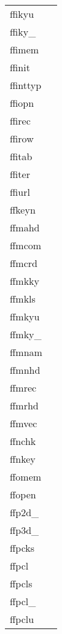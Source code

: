 \documentclass[11pt]{book}
\begin{document}
\begin{tabular}{lr}

ffikyu   & \pageref{ffikyu} \\
ffiky\_    & \pageref{ffikyx} \\
ffimem  & \pageref{ffimem} \\
ffinit  & \pageref{ffinit} \\
ffinttyp    & \pageref{ffinttyp} \\
ffiopn & \pageref{ffopen} \\
ffirec     & \pageref{ffirec} \\
ffirow  & \pageref{ffirow} \\
ffitab    & \pageref{ffitab} \\
ffiter   & \pageref{ffiter} \\
ffiurl & \pageref{ffiurl} \\
ffkeyn      & \pageref{ffkeyn} \\
ffmahd     & \pageref{ffmahd} \\
ffmcom    & \pageref{ffmcom} \\
ffmcrd       & \pageref{ffmcrd} \\
ffmkky    & \pageref{ffmkky} \\
ffmkls    & \pageref{ffmkyx} \\
ffmkyu   & \pageref{ffmkyu} \\
ffmky\_    & \pageref{ffmkyx} \\
ffmnam       & \pageref{ffmnam} \\
ffmnhd     & \pageref{ffmnhd} \\
ffmrec     & \pageref{ffmrec} \\
ffmrhd     & \pageref{ffmrhd} \\
ffmvec  & \pageref{ffmvec} \\
ffnchk  & \pageref{ffnchk} \\
ffnkey      & \pageref{ffnkey} \\
ffomem   & \pageref{ffomem} \\
ffopen      & \pageref{ffopen} \\
ffp2d\_   & \pageref{ffp2dx} \\
ffp3d\_   & \pageref{ffp3dx} \\
ffpcks   & \pageref{ffpcks} \\
ffpcl         & \pageref{ffpcl} \\
ffpcls     & \pageref{ffpcls} \\
ffpcl\_     & \pageref{ffpclx} \\
ffpclu      & \pageref{ffpclu} \\

\end{tabular}
\end{document}
